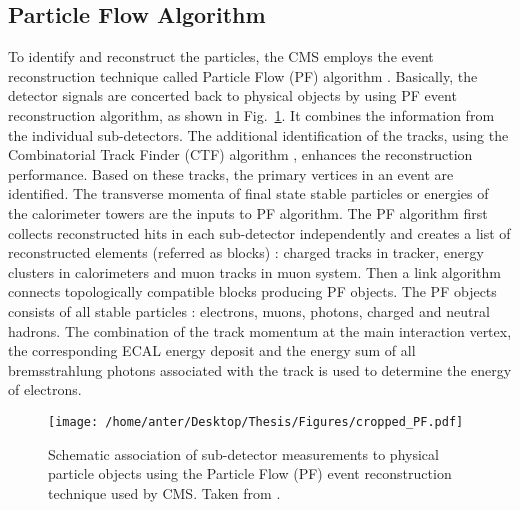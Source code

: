 \subsection{Particle Flow Algorithm}
To identify and reconstruct the particles, the CMS employs the event reconstruction technique called Particle Flow (PF) algorithm \cite{CMS:2009nxa, CMS:2010byl}. Basically, the detector signals are concerted back to physical objects by using PF event reconstruction algorithm, as shown in Fig.~\ref{fig:PF_algo}. 
It combines the information from the individual sub-detectors. The additional identification of the tracks, using the Combinatorial Track Finder (CTF) algorithm \cite{Adam:2005cg}, enhances the reconstruction performance. Based on these tracks, the primary vertices in an event are identified. The transverse momenta of final state stable particles or energies of the calorimeter towers are the inputs to PF algorithm. The PF algorithm first collects reconstructed hits in each sub-detector independently and creates a list of reconstructed elements (referred as blocks) : charged tracks in tracker, energy clusters in calorimeters and muon tracks in muon system. Then a link algorithm connects topologically compatible blocks producing PF objects. The PF objects consists of all stable particles : electrons, muons, photons, charged and neutral hadrons. The combination of the track momentum at the main interaction vertex, the corresponding ECAL energy deposit and the energy sum of all bremsstrahlung photons associated with the track is used to determine the energy of electrons. 
\begin{figure}[!h]
 \begin{center}
 \vspace*{4mm} 
 \texttt{[image: /home/anter/Desktop/Thesis/Figures/cropped\_PF.pdf]}
 \vspace*{5mm}
 \caption[Schematic association of sub-detector measurements to physical particle objects using the Particle Flow (PF) event reconstruction technique used by CMS.]{Schematic association of sub-detector measurements to physical particle objects using the Particle Flow (PF) event reconstruction technique used by CMS. Taken from \cite{Rabbertz:2017ssq}.}
 \label{fig:PF_algo}
 \end{center}
\end{figure}
